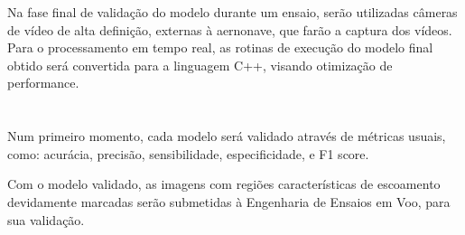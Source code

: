 \documentclass[12pt, a4paper]{article}
\begin{document}
Na fase final de validação do modelo durante um ensaio, serão utilizadas câmeras de vídeo de alta definição, externas à aernonave, que farão a captura dos vídeos. Para o processamento em tempo real, as rotinas de execução do modelo final obtido será convertida para a linguagem C++, visando otimização de performance.


\section{\sectionVII}
\label{sec:result-analysis}
Num primeiro momento, cada modelo será validado através de métricas usuais, como: acurácia, precisão, sensibilidade, especificidade, e F1 score.

Com o modelo validado, as imagens com regiões características de escoamento devidamente marcadas serão submetidas à Engenharia de Ensaios em Voo, para sua validação.





\end{document}
